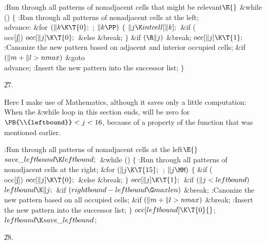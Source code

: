 \B{}:Run through all patterns of nonadjacent cells that might be
relevant\X${}\E{}$\6
\&{while} ()\5
${}\{{}$\1\6
:Run through all patterns of nonadjacent cells at the left\X;\6
\4\\{advance}:\5
\&{for} ${}(\|k\K\T{0};{}$  ; ${}\|k\PP){}$\5
${}\{{}$\1\6
${}\|j\K\\{intcell}[\|k];{}$\6
\&{if} (\\{occ}[\|j])\1\5
${}\\{occ}[\|j]\K\T{0};{}$\2\6
\&{else}\1\5
\&{break};\2\6
\4${}\}{}$\2\6
\&{if} ${}(\R\|j){}$\1\5
\&{break};\2\6
${}\\{occ}[\|j]\K\T{1};{}$\6
:Canonize the new pattern based on adjacent and interior occupied cells\X;\6
\&{if} ${}(\|m+\|l>\\{nmax}){}$\1\5
\&{goto} \\{advance};\2\6
:Insert the new pattern into the successor list\X;\6
\4${}\}{}$\2\par
\U27.\fi

Here I make use of Mathematics, although it saves only a little
computation: When the \&{while} loop in this section ends,
 will be zero
for $\PB{\\{leftbound}}<j<16$, because of a property of the 
function that was mentioned earlier.

\Y\B\4:Run through all patterns of nonadjacent cells at the left\X${}\E{}$\6
$\\{save\_leftbound}\K\\{leftbound};{}$\6
\&{while} ()\5
${}\{{}$\1\6
:Run through all patterns of nonadjacent cells at the right\X;\6
\&{for} ${}(\|j\K\T{15};{}$  ; ${}\|j\MM){}$\5
${}\{{}$\1\6
\&{if} (\\{occ}[\|j])\1\5
${}\\{occ}[\|j]\K\T{0};{}$\2\6
\&{else}\1\5
\&{break};\2\6
\4${}\}{}$\2\6
${}\\{occ}[\|j]\K\T{1};{}$\6
\&{if} ${}(\|j<\\{leftbound}){}$\1\5
${}\\{leftbound}\K\|j;{}$\2\6
\&{if} ${}(\\{rightbound}-\\{leftbound}\G\\{maxlen}){}$\1\5
\&{break};\2\6
:Canonize the new pattern based on all occupied cells\X;\6
\&{if} ${}(\|m+\|l>\\{nmax}){}$\1\5
\&{break};\2\6
:Insert the new pattern into the successor list\X;\6
\4${}\}{}$\2\6
${}\\{occ}[\\{leftbound}]\K\T{0}{}$;\6
${}\\{leftbound}\K\\{save\_leftbound}{}$;\par
\U28.\fi


